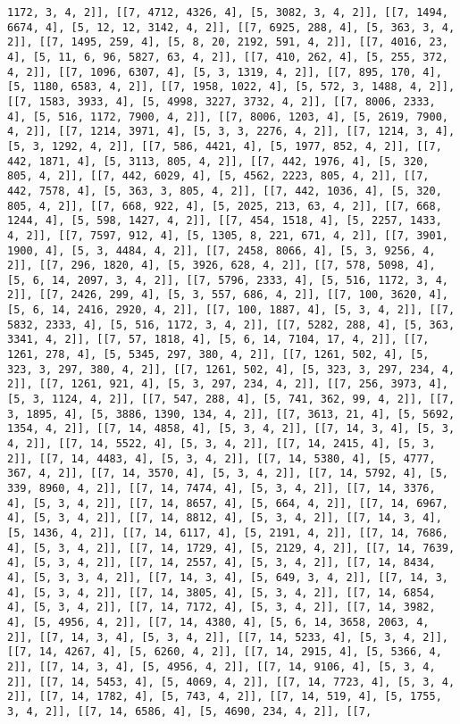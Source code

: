\documentclass[12pt,fleqn]{article}\usepackage{../../common}
\begin{document}
\begin{verbatim}
1172, 3, 4, 2]], [[7, 4712, 4326, 4], [5, 3082, 3, 4, 2]], [[7, 1494, 6674, 4], [5, 12, 12, 3142, 4, 2]], [[7, 6925, 288, 4], [5, 363, 3, 4, 2]], [[7, 1495, 259, 4], [5, 8, 20, 2192, 591, 4, 2]], [[7, 4016, 23, 4], [5, 11, 6, 96, 5827, 63, 4, 2]], [[7, 410, 262, 4], [5, 255, 372, 4, 2]], [[7, 1096, 6307, 4], [5, 3, 1319, 4, 2]], [[7, 895, 170, 4], [5, 1180, 6583, 4, 2]], [[7, 1958, 1022, 4], [5, 572, 3, 1488, 4, 2]], [[7, 1583, 3933, 4], [5, 4998, 3227, 3732, 4, 2]], [[7, 8006, 2333, 4], [5, 516, 1172, 7900, 4, 2]], [[7, 8006, 1203, 4], [5, 2619, 7900, 4, 2]], [[7, 1214, 3971, 4], [5, 3, 3, 2276, 4, 2]], [[7, 1214, 3, 4], [5, 3, 1292, 4, 2]], [[7, 586, 4421, 4], [5, 1977, 852, 4, 2]], [[7, 442, 1871, 4], [5, 3113, 805, 4, 2]], [[7, 442, 1976, 4], [5, 320, 805, 4, 2]], [[7, 442, 6029, 4], [5, 4562, 2223, 805, 4, 2]], [[7, 442, 7578, 4], [5, 363, 3, 805, 4, 2]], [[7, 442, 1036, 4], [5, 320, 805, 4, 2]], [[7, 668, 922, 4], [5, 2025, 213, 63, 4, 2]], [[7, 668, 1244, 4], [5, 598, 1427, 4, 2]], [[7, 454, 1518, 4], [5, 2257, 1433, 4, 2]], [[7, 7597, 912, 4], [5, 1305, 8, 221, 671, 4, 2]], [[7, 3901, 1900, 4], [5, 3, 4484, 4, 2]], [[7, 2458, 8066, 4], [5, 3, 9256, 4, 2]], [[7, 296, 1820, 4], [5, 3926, 628, 4, 2]], [[7, 578, 5098, 4], [5, 6, 14, 2097, 3, 4, 2]], [[7, 5796, 2333, 4], [5, 516, 1172, 3, 4, 2]], [[7, 2426, 299, 4], [5, 3, 557, 686, 4, 2]], [[7, 100, 3620, 4], [5, 6, 14, 2416, 2920, 4, 2]], [[7, 100, 1887, 4], [5, 3, 4, 2]], [[7, 5832, 2333, 4], [5, 516, 1172, 3, 4, 2]], [[7, 5282, 288, 4], [5, 363, 3341, 4, 2]], [[7, 57, 1818, 4], [5, 6, 14, 7104, 17, 4, 2]], [[7, 1261, 278, 4], [5, 5345, 297, 380, 4, 2]], [[7, 1261, 502, 4], [5, 323, 3, 297, 380, 4, 2]], [[7, 1261, 502, 4], [5, 323, 3, 297, 234, 4, 2]], [[7, 1261, 921, 4], [5, 3, 297, 234, 4, 2]], [[7, 256, 3973, 4], [5, 3, 1124, 4, 2]], [[7, 547, 288, 4], [5, 741, 362, 99, 4, 2]], [[7, 3, 1895, 4], [5, 3886, 1390, 134, 4, 2]], [[7, 3613, 21, 4], [5, 5692, 1354, 4, 2]], [[7, 14, 4858, 4], [5, 3, 4, 2]], [[7, 14, 3, 4], [5, 3, 4, 2]], [[7, 14, 5522, 4], [5, 3, 4, 2]], [[7, 14, 2415, 4], [5, 3, 2]], [[7, 14, 4483, 4], [5, 3, 4, 2]], [[7, 14, 5380, 4], [5, 4777, 367, 4, 2]], [[7, 14, 3570, 4], [5, 3, 4, 2]], [[7, 14, 5792, 4], [5, 339, 8960, 4, 2]], [[7, 14, 7474, 4], [5, 3, 4, 2]], [[7, 14, 3376, 4], [5, 3, 4, 2]], [[7, 14, 8657, 4], [5, 664, 4, 2]], [[7, 14, 6967, 4], [5, 3, 4, 2]], [[7, 14, 8812, 4], [5, 3, 4, 2]], [[7, 14, 3, 4], [5, 1436, 4, 2]], [[7, 14, 6117, 4], [5, 2191, 4, 2]], [[7, 14, 7686, 4], [5, 3, 4, 2]], [[7, 14, 1729, 4], [5, 2129, 4, 2]], [[7, 14, 7639, 4], [5, 3, 4, 2]], [[7, 14, 2557, 4], [5, 3, 4, 2]], [[7, 14, 8434, 4], [5, 3, 3, 4, 2]], [[7, 14, 3, 4], [5, 649, 3, 4, 2]], [[7, 14, 3, 4], [5, 3, 4, 2]], [[7, 14, 3805, 4], [5, 3, 4, 2]], [[7, 14, 6854, 4], [5, 3, 4, 2]], [[7, 14, 7172, 4], [5, 3, 4, 2]], [[7, 14, 3982, 4], [5, 4956, 4, 2]], [[7, 14, 4380, 4], [5, 6, 14, 3658, 2063, 4, 2]], [[7, 14, 3, 4], [5, 3, 4, 2]], [[7, 14, 5233, 4], [5, 3, 4, 2]], [[7, 14, 4267, 4], [5, 6260, 4, 2]], [[7, 14, 2915, 4], [5, 5366, 4, 2]], [[7, 14, 3, 4], [5, 4956, 4, 2]], [[7, 14, 9106, 4], [5, 3, 4, 2]], [[7, 14, 5453, 4], [5, 4069, 4, 2]], [[7, 14, 7723, 4], [5, 3, 4, 2]], [[7, 14, 1782, 4], [5, 743, 4, 2]], [[7, 14, 519, 4], [5, 1755, 3, 4, 2]], [[7, 14, 6586, 4], [5, 4690, 234, 4, 2]], [[7, 
\end{verbatim}
\end{document}
